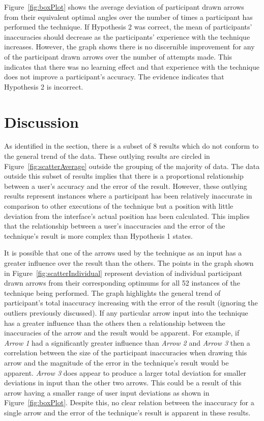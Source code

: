 \documentclass{bmcart}
\begin{document}

Figure~\ref{fig:boxPlot} shows the average deviation of participant drawn arrows from their equivalent optimal angles over the number of times a participant has performed the technique.
If Hypothesis 2 was correct, the mean of participants' inaccuracies should decrease as the participants' experience with the technique increases.
However, the graph shows there is no discernible improvement for any of the participant drawn arrows over the number of attempts made.
This indicates that there was no learning effect and that experience with the technique does not improve a participant's accuracy.
The evidence indicates that Hypothesis 2 is incorrect.


\section*{Discussion}\label{sec:discussion}

As identified in the  section, there is a subset of 8 results which do not conform to the general trend of the data.
These outlying results are circled in Figure~\ref{fig:scatterAverage} outside the grouping of the majority of data.
The data outside this subset of results implies that there is a proportional relationship between a user's accuracy and the error of the result.
However, these outlying results represent instances where a participant has been relatively inaccurate in comparison to other executions of the technique but a position with little deviation from the interface's actual position has been calculated.
This implies that the relationship between a user's inaccuracies and the error of the technique's result is more complex than Hypothesis 1 states.


It is possible that one of the arrows used by the technique as an input has a greater influence over the result than the others.
The points in the graph shown in Figure~\ref{fig:scatterIndividual} represent deviation of individual participant drawn arrows from their corresponding optimums for all 52 instances of the technique being performed.
The graph highlights the general trend of participant's total inaccuracy increasing with the error of the result (ignoring the outliers previously discussed).
If any particular arrow input into the technique has a greater influence than the others then a relationship between the inaccuracies of the arrow and the result would be apparent.
For example, if {\emph{Arrow 1}} had a significantly greater influence than {\emph{Arrow 2}} and {\emph{Arrow 3}} then a correlation between the size of the participant inaccuracies when drawing this arrow and the magnitude of the error in the technique's result would be apparent.
{\emph{Arrow 3}} does appear to produce a larger total deviation for smaller deviations in input than the other two arrows.
This could be a result of this arrow having a smaller range of user input deviations as shown in Figure~\ref{fig:boxPlot}.
Despite this, no clear relation between the inaccuracy for a single arrow and the error of the technique's result is apparent in these results.
\end{document}
